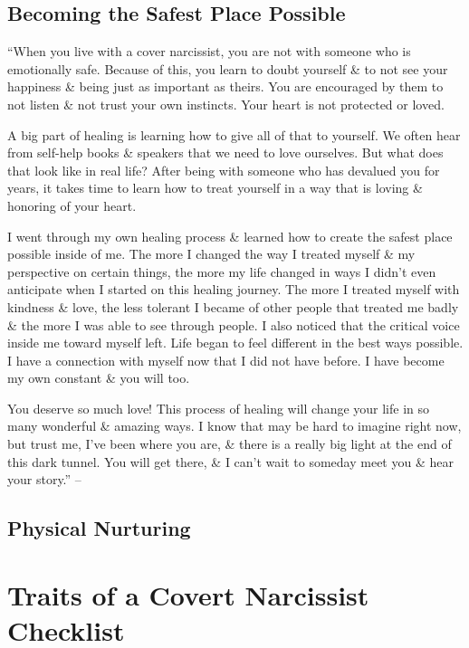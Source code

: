 \documentclass{article}
\numberwithin{equation}{section}
\begin{document}
\subsection{Becoming the Safest Place Possible}
``When you live with a cover narcissist, you are not with someone who is emotionally safe. Because of this, you learn to doubt yourself \& to not see your happiness \& being just as important as theirs. You are encouraged by them to not listen \& not trust your own instincts. Your heart is not protected or loved.

A big part of healing is learning how to give all of that to yourself. We often hear from self-help books \& speakers that we need to love ourselves. But what does that look like in real life? After being with someone who has devalued you for years, it takes time to learn how to treat yourself in a way that is loving \& honoring of your heart.

I went through my own healing process \& learned how to create the safest place possible inside of me. The more I changed the way I treated myself \& my perspective on certain things, the more my life changed in ways I didn't even anticipate when I started on this healing journey. The more I treated myself with kindness \& love, the less tolerant I became of other people that treated me badly \& the more I was able to see through people. I also noticed that the critical voice inside me toward myself left. Life began to feel different in the best ways possible. I have a connection with myself now that I did not have before. I have become my own constant \& you will too.

You deserve so much love! This process of healing will change your life in so many wonderful \& amazing ways. I know that may be hard to imagine right now, but trust me, I've been where you are, \& there is a really big light at the end of this dark tunnel. You will get there, \& I can't wait to someday meet you \& hear your story.'' -- \cite[pp. 159--160]{Mirza2017}

\subsection{Physical Nurturing}


\section{Traits of a Covert Narcissist Checklist}
\end{document}
